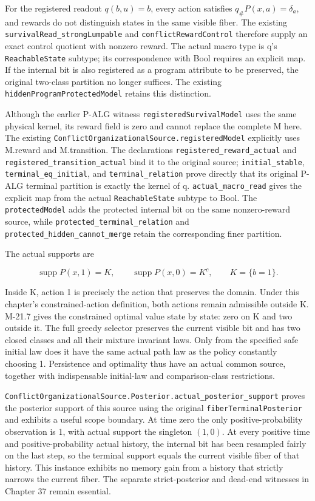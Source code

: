 \documentclass[
  english,
  11pt,
  oneside]{book}
\begin{document}
For the registered readout \(q(b,u)=b\), every action satisfies \(q_\#P(x,a)=\delta_a\), and rewards do not distinguish states in the same visible fiber. The existing \nolinkurl{survivalRead_strongLumpable} and \nolinkurl{conflictRewardControl} therefore supply an exact control quotient with nonzero reward. The actual macro type is q's \nolinkurl{ReachableState} subtype; its correspondence with Bool requires an explicit map. If the internal bit is also registered as a program attribute to be preserved, the original two-class partition no longer suffices. The existing \nolinkurl{hiddenProgramProtectedModel} retains this distinction.

Although the earlier P-ALG witness \nolinkurl{registeredSurvivalModel} uses the same physical kernel, its reward field is zero and cannot replace the complete M here. The existing \nolinkurl{ConflictOrganizationalSource.registeredModel} explicitly uses M.reward and M.transition. The declarations \nolinkurl{registered_reward_actual} and \nolinkurl{registered_transition_actual} bind it to the original source; \nolinkurl{initial_stable}, \nolinkurl{terminal_eq_initial}, and \nolinkurl{terminal_relation} prove directly that its original P-ALG terminal partition is exactly the kernel of q. \nolinkurl{actual_macro_read} gives the explicit map from the actual \nolinkurl{ReachableState} subtype to Bool. The \nolinkurl{protectedModel} adds the protected internal bit on the same nonzero-reward source, while \nolinkurl{protected_terminal_relation} and \nolinkurl{protected_hidden_cannot_merge} retain the corresponding finer partition.

The actual supports are

\[\operatorname{supp}P(x,1)=K,\qquad
\operatorname{supp}P(x,0)=K^c,\qquad K=\{b=1\}.\]

Inside K, action 1 is precisely the action that preserves the domain. Under this chapter's constrained-action definition, both actions remain admissible outside K. M-21.7 gives the constrained optimal value state by state: zero on K and two outside it. The full greedy selector preserves the current visible bit and has two closed classes and all their mixture invariant laws. Only from the specified safe initial law does it have the same actual path law as the policy constantly choosing 1. Persistence and optimality thus have an actual common source, together with indispensable initial-law and comparison-class restrictions.

\nolinkurl{ConflictOrganizationalSource.Posterior.actual_posterior_support} proves the posterior support of this source using the original \nolinkurl{fiberTerminalPosterior} and exhibits a useful scope boundary. At time zero the only positive-probability observation is 1, with actual support the singleton \((1,0)\). At every positive time and positive-probability actual history, the internal bit has been resampled fairly on the last step, so the terminal support equals the current visible fiber of that history. This instance exhibits no memory gain from a history that strictly narrows the current fiber. The separate strict-posterior and dead-end witnesses in Chapter 37 remain essential.
\end{document}
